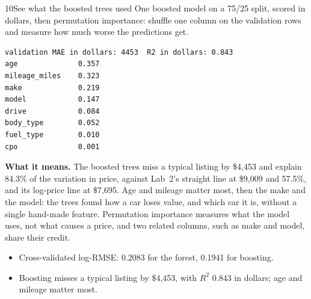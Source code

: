 \begin{labquestion}{10}{See what the boosted trees used}
One boosted model on a 75/25 split, scored in dollars, then permutation importance: shuffle one column on the validation rows and measure how much worse the predictions get.
\end{labquestion}
\begin{labanswer}

\begin{refoutput}
\begin{lstlisting}[style=utpterminal]
validation MAE in dollars: 4453  R2 in dollars: 0.843
age              0.357
mileage_miles    0.323
make             0.219
model            0.147
drive            0.084
body_type        0.052
fuel_type        0.010
cpo              0.001
\end{lstlisting}
\end{refoutput}

\textbf{What it means.} The boosted trees miss a typical listing by \$4,453 and explain 84.3\% of the variation in price, against Lab~2's straight line at \$9,009 and 57.5\%, and its log-price line at \$7,695. Age and mileage matter most, then the make and the model: the trees found how a car loses value, and which car it is, without a single hand-made feature. Permutation importance measures what the model uses, not what causes a price, and two related columns, such as make and model, share their credit.
\end{labanswer}

\begin{labcheckpoint}
\begin{itemize}[leftmargin=1.2em,itemsep=2pt,topsep=1pt]
  \item Cross-validated log-RMSE: 0.2083 for the forest, 0.1941 for boosting.
  \item Boosting misses a typical listing by \$4,453, with $R^2$ 0.843 in dollars; age and mileage matter most.
\end{itemize}
\end{labcheckpoint}


